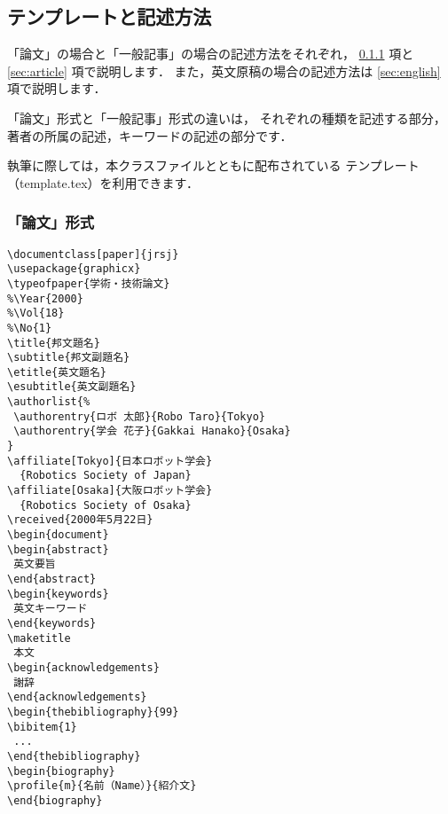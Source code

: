 \documentclass[paper]{jrsj}    %
\begin{document}
\subsection{テンプレートと記述方法}

「論文」の場合と「一般記事」の場合の記述方法をそれぞれ，
\ref{sec:paper} 項と \ref{sec:article} 項で説明します．
また，英文原稿の場合の記述方法は \ref{sec:english} 項で説明します．

「論文」形式と「一般記事」形式の違いは，
それぞれの種類を記述する部分，
著者の所属の記述，キーワードの記述の部分です．

執筆に際しては，本クラスファイルとともに配布されている
テンプレート（{\ttfamily template.tex}）を利用できます．

\subsubsection{「論文」形式}\label{sec:paper}

\begin{verbatim}
\documentclass[paper]{jrsj}
\usepackage{graphicx}
\typeofpaper{学術・技術論文}
%\Year{2000}
%\Vol{18}
%\No{1}
\title{邦文題名}
\subtitle{邦文副題名}
\etitle{英文題名}
\esubtitle{英文副題名}
\authorlist{%
 \authorentry{ロボ 太郎}{Robo Taro}{Tokyo}
 \authorentry{学会 花子}{Gakkai Hanako}{Osaka}
}
\affiliate[Tokyo]{日本ロボット学会}
  {Robotics Society of Japan}
\affiliate[Osaka]{大阪ロボット学会}
  {Robotics Society of Osaka}
\received{2000年5月22日} 
\begin{document}
\begin{abstract}
 英文要旨
\end{abstract}
\begin{keywords}
 英文キーワード
\end{keywords}
\maketitle
 本文
\begin{acknowledgements}
 謝辞
\end{acknowledgements}
\begin{thebibliography}{99}
\bibitem{1}
 ...
\end{thebibliography}
\begin{biography}
\profile{m}{名前（Name）}{紹介文}
\end{biography}
\end{verbatim}
\end{document}
